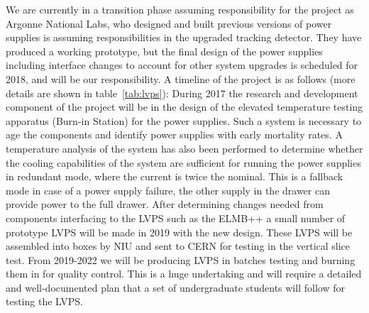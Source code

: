 We are currently in a transition phase assuming responsibility for the project as Argonne National Labs, who designed and built previous versions of power supplies is assuming responsibilities in the upgraded tracking detector. 
They have produced a working prototype, but the final design of the power supplies  
including interface changes to account for other system upgrades is scheduled for 2018, and will be our responsibility.
A timeline of the project is as follows (more details are shown in table~\ref{tab:lvps}):
During 2017 the research and development component of the project will be in the design of the elevated temperature testing apparatus (Burn-in Station)
for the power supplies.  Such a system is necessary to age the components and identify power supplies with early mortality rates.  A temperature analysis of the system has also been performed to determine whether the cooling capabilities of the system are sufficient 
for running the power supplies in redundant mode, where the current is twice the nominal.  This is a fallback mode in case of a power supply failure, the other supply in the drawer can provide power to the full drawer.
After determining changes needed from components interfacing to the LVPS such as the ELMB++ a small number of prototype LVPS will be made in 2019 with the new design.
These LVPS will be assembled into boxes by NIU and sent to CERN for testing in the vertical slice test. From 2019-2022 we will be producing LVPS in batches testing and burning them in for quality control.  This is a huge undertaking and will require a detailed and well-documented 
plan that a set of undergraduate students will follow for testing the LVPS.

